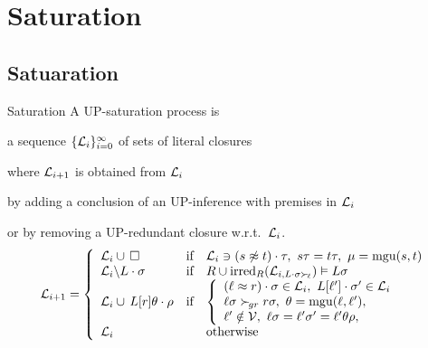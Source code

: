 \documentclass[%
handout,
]{beamer}
\begin{document}
\section{Saturation}
\subsection{Satuaration}
\begin{frame}[allowframebreaks]{Saturation}
        A UP-{saturation process} is

        a sequence \( \{ \mathcal{L}_i \}_{i=0}^\infty \)
        of sets of literal closures

        where \( \mathcal{L}_{i+1} \) is obtained from \( \mathcal{L}_i \)

        by {adding} a conclusion of an UP-inference with premises in $\mathcal{L}_i$

        or by {removing} a UP-redundant closure w.r.t.~\(\mathcal{L}_i\).
        \begin{gather*}
            \mathcal{L}_{i+1} = \left\{
                \begin{array}{lclc}
                    \mathcal{L}_i \cup\,\square
                    &\text{if}
                    &
                        \mathcal{L}_i\ni(s\not\approx t)\cdot\tau,\ {}
                        s\tau = t\tau,\ {}
                        \mu=\operatorname{mgu}(s,t)
                    \\
                    \mathcal{L}_i \backslash L\cdot\sigma
                    &\text{if}
                    &R \cup \operatorname{irred}_R(\mathcal{L}_{i,L\cdot\sigma\mathrel\succ_{\!\ell}}) \vDash L\sigma
                    \\
                    \mathcal{L}_i \cup\, L[r]\theta\cdot\rho
                    &\text{if}
                    &\left\{\begin{array}{l}
                        (\ell\approx r)\cdot\sigma\in\mathcal{L}_i,\ {}
                        L[\ell']\cdot\sigma'\in\mathcal{L}_i
                        \\
                        \ell\sigma\mathrel\succ_{\!gr} r\sigma,\ {}
                        \theta=\operatorname{mgu}(\ell,\ell'),
                        \\
                        \ell'\notin\mathcal{V},\ {}
                        \ell\sigma = \ell'\sigma' = \ell'\theta\rho,
                    \end{array}\right.
                    \\
                    \mathcal{L}_i
                    &&\text{otherwise}
                \end{array}
            \right.
        \end{gather*}
    \newpage


\end{frame}
\end{document}
